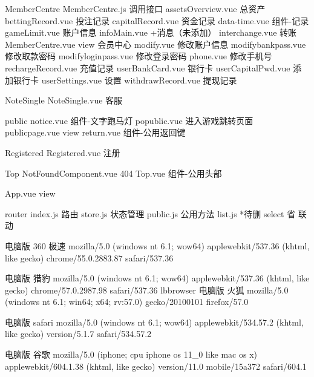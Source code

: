 MemberCentre
    MemberCentre.js             调用接口
    assetsOverview.vue          总资产
    bettingRecord.vue           投注记录
    capitalRecord.vue           资金记录
    data-time.vue               组件-记录
    gameLimit.vue               账户信息
    infoMain.vue                +消息（未添加）
    interchange.vue             转账
    MemberCentre.vue            view    会员中心
    modify.vue                  修改账户信息
    modifybankpass.vue          修改取款密码
    modifyloginpass.vue         修改登录密码
    phone.vue                   修改手机号
    rechargeRecord.vue          充值记录
    userBankCard.vue            银行卡
    userCapitalPwd.vue          添加银行卡
    userSettings.vue            设置
    withdrawRecord.vue          提现记录

NoteSingle
    NoteSingle.vue              客服

public
    notice.vue                  组件-文字跑马灯
    popublic.vue                进入游戏跳转页面
    publicpage.vue              view
    return.vue                  组件-公用返回键

Registered
    Registered.vue              注册

Top
    NotFoundComponent.vue       404
    Top.vue                     组件-公用头部



App.vue                         view

router
index.js                        路由
store.js                        状态管理
public.js                       公用方法
list.js                         *待删 select 省 联动



电脑版
360 极速
mozilla/5.0 (windows nt 6.1; wow64) applewebkit/537.36 (khtml, like gecko) chrome/55.0.2883.87 safari/537.36

电脑版 猎豹
mozilla/5.0 (windows nt 6.1; wow64) applewebkit/537.36 (khtml, like gecko) chrome/57.0.2987.98 safari/537.36 lbbrowser
电脑版 火狐
mozilla/5.0 (windows nt 6.1; win64; x64; rv:57.0) gecko/20100101 firefox/57.0

电脑版 safari
mozilla/5.0 (windows nt 6.1; wow64) applewebkit/534.57.2 (khtml, like gecko) version/5.1.7 safari/534.57.2


电脑版 谷歌
mozilla/5.0 (iphone; cpu iphone os 11_0 like mac os x) applewebkit/604.1.38 (khtml, like gecko) version/11.0 mobile/15a372 safari/604.1




